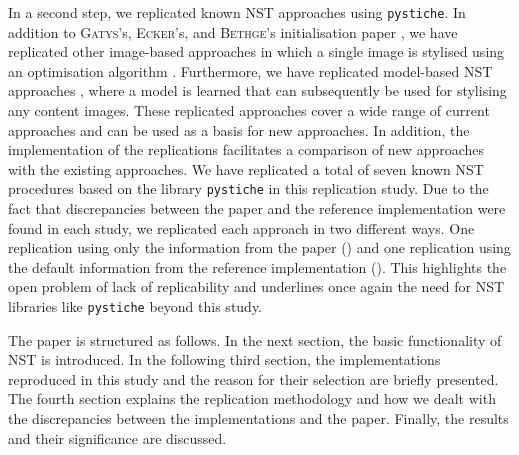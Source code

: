 In a second step, we replicated known \gls{NST} approaches using \texttt{pystiche}. In addition to \textsc{Gatys}'s, \textsc{Ecker}'s, and \textsc{Bethge}'s initialisation paper \cite{GEB2016}, we have replicated other image-based approaches in which a single image is stylised using an optimisation algorithm \cite{LW2016,GEB+2017}. Furthermore, we have replicated model-based \gls{NST} approaches \cite{JAL2016,ULVL2016,UVL2017,SKLO2018}, where a model is learned that can subsequently be used for stylising any content images. These replicated approaches cover a wide range of current approaches and can be used as a basis for new approaches. In addition, the implementation of the replications facilitates a comparison of new approaches with the existing approaches. We have replicated a total of seven known \gls{NST} procedures based on the library \texttt{pystiche} in this replication study. Due to the fact that discrepancies between the paper and the reference implementation were found in each study, we replicated each approach in two different ways. One replication using only the information from the paper (\paper{}) and one replication using the default information from the reference implementation (\implementation{}). This highlights the open problem of lack of replicability and underlines once again the need for \gls{NST} libraries like \texttt{pystiche} beyond this study.

The paper is structured as follows. In the next section, the basic functionality of \gls{NST} is introduced. In the following third section, the implementations reproduced in this study and the reason for their selection are briefly presented. The fourth section explains the replication methodology and how we dealt with the discrepancies between the implementations and the paper. Finally, the results and their significance are discussed.